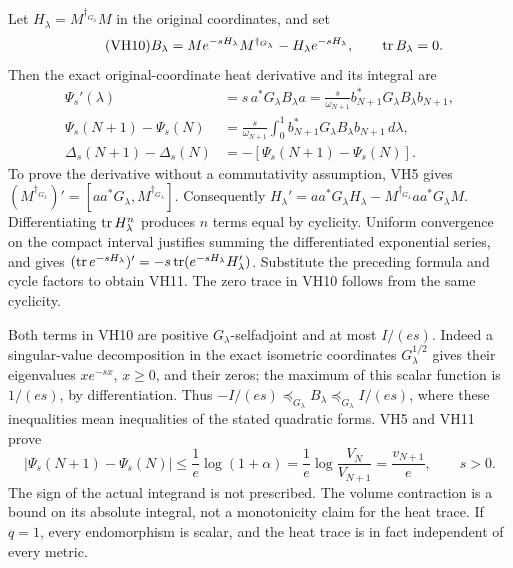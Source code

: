 Let \(H_\lambda=M^{\dagger_{G_\lambda}}M\) in the original coordinates,
and set
\begin{equation}\tag{VH10}\label{hvh:VH10}
B_\lambda=M e^{-sH_\lambda}M^{\dagger_{G_\lambda}}
-H_\lambda e^{-sH_\lambda},\qquad \operatorname{tr} B_\lambda=0.
\end{equation}
Then the exact original-coordinate heat derivative and its integral are
\begin{equation}\tag{VH11}\label{hvh:VH11}
\begin{split}
\Psi_s'(\lambda)&=s\,a^*G_\lambda B_\lambda a
=\frac{s}{\omega_{N+1}}b_{N+1}^*G_\lambda B_\lambda b_{N+1},\\
\Psi_s(N+1)-\Psi_s(N)
&=\frac{s}{\omega_{N+1}}\int_0^1
b_{N+1}^*G_\lambda B_\lambda b_{N+1}\,d\lambda,\\
\Delta_s(N+1)-\Delta_s(N)&=-[\Psi_s(N+1)-\Psi_s(N)].
\end{split}
\end{equation}
To prove the derivative without a commutativity assumption, VH5 gives
\((M^{\dagger_{G_\lambda}})'=[aa^*G_\lambda,M^{\dagger_{G_\lambda}}]\).
Consequently
\(H_\lambda'=aa^*G_\lambda H_\lambda-
M^{\dagger_{G_\lambda}}aa^*G_\lambda M\).
Differentiating \(\operatorname{tr} H_\lambda^n\) produces \(n\) terms equal by
cyclicity. Uniform convergence on the compact interval justifies
summing the differentiated exponential series, and gives
\((\operatorname{tr} e^{-sH_\lambda})'=-s\operatorname{tr}(e^{-sH_\lambda}H_\lambda')\).
Substitute the preceding formula and cycle factors to obtain VH11.
The zero trace in VH10 follows from the same cyclicity.

Both terms in VH10 are positive \(G_\lambda\)-selfadjoint and at most
\(I/(es)\). Indeed a singular-value decomposition in the exact
isometric coordinates \(G_\lambda^{1/2}\) gives their eigenvalues
\(x e^{-sx}\), \(x\ge0\), and their zeros; the maximum of this scalar
function is \(1/(es)\), by differentiation. Thus
\(-I/(es)\preceq_{G_\lambda}B_\lambda\preceq_{G_\lambda}I/(es)\),
where these inequalities mean inequalities of the stated quadratic forms.
VH5 and VH11 prove
\begin{equation}\tag{VH12}\label{hvh:VH12}
\boxed{\quad
|\Psi_s(N+1)-\Psi_s(N)|
\le\frac1e\log(1+\alpha)
=\frac1e\log\frac{V_N}{V_{N+1}}
=\frac{v_{N+1}}e,\qquad s>0.\quad}
\end{equation}
The sign of the actual integrand is not prescribed. The volume
contraction is a bound on its absolute integral, not a monotonicity
claim for the heat trace. If \(q=1\), every endomorphism is scalar,
and the heat trace is in fact independent of every metric.

